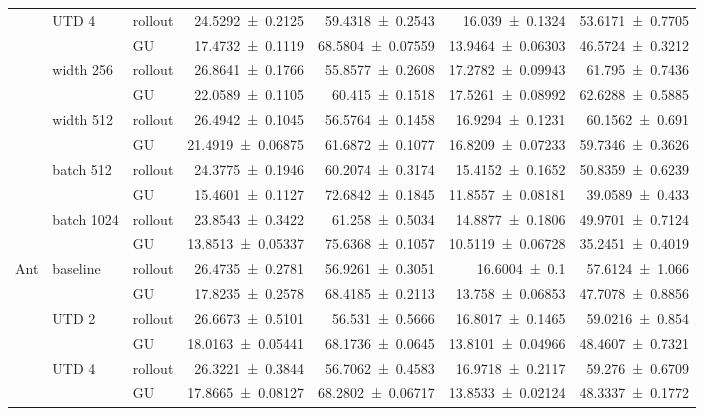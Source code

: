 {\begin{longtable}{@{}lllrrrr@{}}
    \addlinespace[2pt]
     & UTD 4 & rollout & \num{24.5292+-0.2125} & \num{59.4318+-0.2543} & \num{16.039+-0.1324} & \num{53.6171+-0.7705} \\
     &  & GU & \num{17.4732+-0.1119} & \num{68.5804+-0.07559} & \num{13.9464+-0.06303} & \num{46.5724+-0.3212} \\
    \addlinespace[2pt]
     & width 256 & rollout & \num{26.8641+-0.1766} & \num{55.8577+-0.2608} & \num{17.2782+-0.09943} & \num{61.795+-0.7436} \\
     &  & GU & \num{22.0589+-0.1105} & \num{60.415+-0.1518} & \num{17.5261+-0.08992} & \num{62.6288+-0.5885} \\
    \addlinespace[2pt]
     & width 512 & rollout & \num{26.4942+-0.1045} & \num{56.5764+-0.1458} & \num{16.9294+-0.1231} & \num{60.1562+-0.691} \\
     &  & GU & \num{21.4919+-0.06875} & \num{61.6872+-0.1077} & \num{16.8209+-0.07233} & \num{59.7346+-0.3626} \\
    \addlinespace[2pt]
     & batch 512 & rollout & \num{24.3775+-0.1946} & \num{60.2074+-0.3174} & \num{15.4152+-0.1652} & \num{50.8359+-0.6239} \\
     &  & GU & \num{15.4601+-0.1127} & \num{72.6842+-0.1845} & \num{11.8557+-0.08181} & \num{39.0589+-0.433} \\
    \addlinespace[2pt]
     & batch 1024 & rollout & \num{23.8543+-0.3422} & \num{61.258+-0.5034} & \num{14.8877+-0.1806} & \num{49.9701+-0.7124} \\
     &  & GU & \num{13.8513+-0.05337} & \num{75.6368+-0.1057} & \num{10.5119+-0.06728} & \num{35.2451+-0.4019} \\
    \addlinespace[2pt]
    \midrule
    Ant & baseline & rollout & \num{26.4735+-0.2781} & \num{56.9261+-0.3051} & \num{16.6004+-0.1} & \num{57.6124+-1.066} \\
     &  & GU & \num{17.8235+-0.2578} & \num{68.4185+-0.2113} & \num{13.758+-0.06853} & \num{47.7078+-0.8856} \\
    \addlinespace[2pt]
     & UTD 2 & rollout & \num{26.6673+-0.5101} & \num{56.531+-0.5666} & \num{16.8017+-0.1465} & \num{59.0216+-0.854} \\
     &  & GU & \num{18.0163+-0.05441} & \num{68.1736+-0.0645} & \num{13.8101+-0.04966} & \num{48.4607+-0.7321} \\
    \addlinespace[2pt]
     & UTD 4 & rollout & \num{26.3221+-0.3844} & \num{56.7062+-0.4583} & \num{16.9718+-0.2117} & \num{59.276+-0.6709} \\
     &  & GU & \num{17.8665+-0.08127} & \num{68.2802+-0.06717} & \num{13.8533+-0.02124} & \num{48.3337+-0.1772} \\

\end{longtable}}
